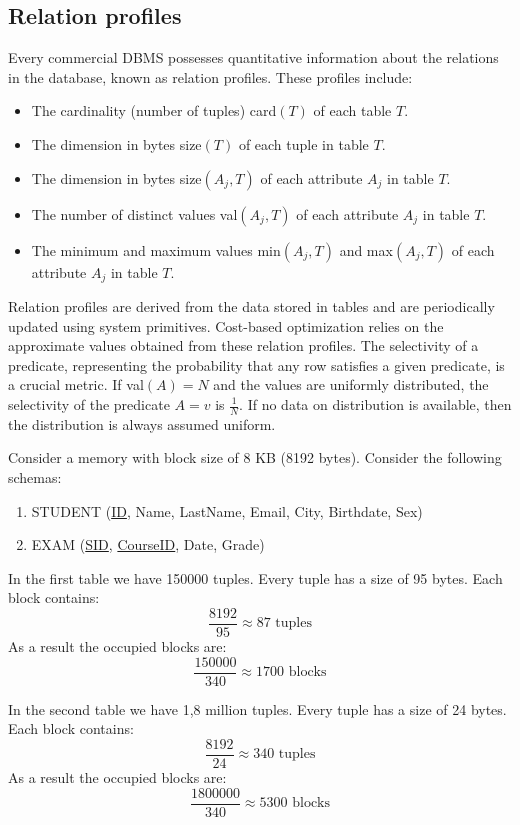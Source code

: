 \subsection{Relation profiles}
Every commercial DBMS possesses quantitative information about the relations in the database, known as relation profiles. 
These profiles include:
\begin{itemize}
    \item The cardinality (number of tuples) card$(T)$ of each table $T$.
    \item The dimension in bytes size$(T)$ of each tuple in table $T$.
    \item The dimension in bytes size$(A_j, T)$ of each attribute $A_j$ in table $T$.
    \item The number of distinct values val$(A_j, T)$ of each attribute $A_j$ in table $T$.
    \item The minimum and maximum values min$(A_j, T)$ and max$(A_j, T)$ of each attribute $A_j$ in table $T$.
\end{itemize}
Relation profiles are derived from the data stored in tables and are periodically updated using system primitives. 
Cost-based optimization relies on the approximate values obtained from these relation profiles.
The selectivity of a predicate, representing the probability that any row satisfies a given predicate, is a crucial metric.
If val$(A) = N$ and the values are uniformly distributed, the selectivity of the predicate $A = v$ is $\frac{1}{N}$.
If no data on distribution is available, then the distribution is always assumed uniform.
\begin{example}
    Consider a memory with block size of 8 KB (8192 bytes). 
    Consider the following schemas: 
    \begin{enumerate}
        \item STUDENT (\underline{ID}, Name, LastName, Email, City, Birthdate, Sex)
        \item EXAM (\underline{SID}, \underline{CourseID}, Date, Grade)
    \end{enumerate}

    In the first table we have 150000 tuples. 
    Every tuple has a size of 95 bytes. 
    Each block contains: 
    \[\dfrac{8192}{95} \approx 87 \text{ tuples}\]
    As a result the occupied blocks are: 
    \[\dfrac{150000}{340} \approx 1700 \text{ blocks}\]

    In the second table we have 1,8 million tuples. 
    Every tuple has a size of 24 bytes. 
    Each block contains: 
    \[\dfrac{8192}{24} \approx 340 \text{ tuples}\]
    As a result the occupied blocks are: 
    \[\dfrac{1800000}{340} \approx 5300 \text{ blocks}\]
\end{example}

